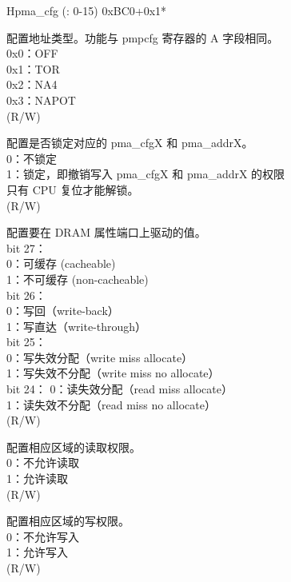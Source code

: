 \begin{register}{H}{pma\_cfg (: 0-15)} {0xBC0+0x1*}
\label{regdesc:pma_cfgX}
%
%
%
%
%
%
%
%
%
%
\regnewline%
\begin{regdesc}
\begin{reglist}
\label{fielddesc:A}\item [A] 配置地址类型。功能与 pmpcfg 寄存器的 A 字段相同。\\
0x0：OFF\\
0x1：TOR\\
0x2：NA4\\
0x3：NAPOT\\
(R/W)
\label{fielddesc:LOCK}\item [LOCK] 配置是否锁定对应的 pma\_cfgX 和 pma\_addrX。\\
0：不锁定\\
1：锁定，即撤销写入 pma\_cfgX 和 pma\_addrX 的权限\\
只有 CPU 复位才能解锁。\\
(R/W)
\label{fielddesc:ATTRIBUTE}\item [ATTRIBUTE] 配置要在 DRAM 属性端口上驱动的值。\\
bit 27： \\ 
0：可缓存 (cacheable)\\
1：不可缓存 (non-cacheable)\\
bit 26：\\
0：写回（write-back）\\  
1：写直达（write-through）\\
bit 25：\\
0：写失效分配（write miss allocate）\\
1：写失效不分配（write miss no allocate）\\
bit 24：  
0：读失效分配（read miss allocate）\\
1：读失效不分配（read miss no allocate）\\
(R/W)
\label{fielddesc:READ}\item [READ] 配置相应区域的读取权限。\\
0：不允许读取\\
1：允许读取\\
(R/W)
\label{fielddesc:WRITE}\item [WRITE] 配置相应区域的写权限。\\
0：不允许写入\\
1：允许写入\\
(R/W)
\item [见下页……]
\end{reglist}\end{regdesc}
\end{register}
